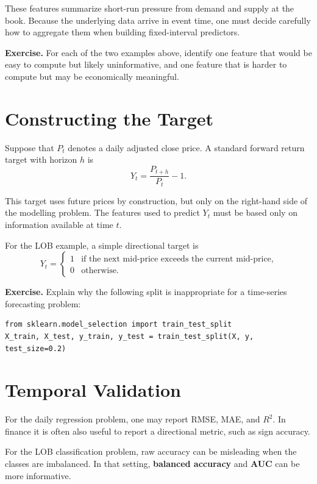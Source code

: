 \documentclass[11pt]{article}
\newcommand{\answerlines}[1]{\vspace{#1\baselineskip}}
\begin{document}
These features summarize short-run pressure from demand and supply at the book.
Because the underlying data arrive in event time, one must decide carefully how
to aggregate them when building fixed-interval predictors.

\textbf{Exercise.} For each of the two examples above, identify one feature
that would be easy to compute but likely uninformative, and one feature that is
harder to compute but may be economically meaningful.

\answerlines{6}

\newpage

\section*{Constructing the Target}

Suppose that $P_t$ denotes a daily adjusted close price. A standard forward
return target with horizon $h$ is
\[
Y_t = \frac{P_{t+h}}{P_t} - 1.
\]

This target uses future prices by construction, but only on the right-hand side
of the modelling problem. The features used to predict $Y_t$ must be based only
on information available at time $t$.

For the LOB example, a simple directional target is
\[
Y_t =
\begin{cases}
1 & \text{if the next mid-price exceeds the current mid-price,}\\
0 & \text{otherwise.}
\end{cases}
\]

\textbf{Exercise.} Explain why the following split is inappropriate for a
time-series forecasting problem:

\begin{verbatim}
from sklearn.model_selection import train_test_split
X_train, X_test, y_train, y_test = train_test_split(X, y, test_size=0.2)
\end{verbatim}

\answerlines{6}

\section*{Temporal Validation}

For the daily regression problem, one may report RMSE, MAE, and $R^2$. In
finance it is often also useful to report a directional metric, such as sign
accuracy.

For the LOB classification problem, raw accuracy can be misleading when the
classes are imbalanced. In that setting, \textbf{balanced accuracy} and
\textbf{AUC} can be more informative.
\end{document}
